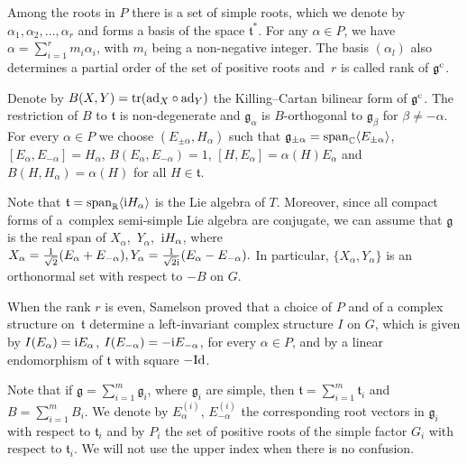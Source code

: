Among the roots in $P$ there is a set of simple roots, which we denote by $\alpha_1, \alpha_2,\dots ,\alpha_r$ and forms a basis of the space $\mathfrak t^*$. For any $\alpha \in P$, we have $\alpha = \sum_{i =1}^r m_i\alpha_i$, with $m_i$ being a non-negative integer. The basis $(\alpha_l)$ also determines a partial order of the set of positive roots and~$r$ is called rank of $\mathfrak g^{\rm c}$.

Denote by $B(X,Y) = {\rm tr} ({\rm ad}_X \circ {\rm ad}_Y)$ the Killing--Cartan bilinear form of $\mathfrak g^{\rm c}$. The restriction of $B$ to $\mathfrak t$ is non-degenerate and $\mathfrak g_{\alpha}$ is $B$-orthogonal to $\mathfrak g_{\beta}$ for $\beta \neq - \alpha$.
 For every $\alpha \in P$ we choose $(E_{\pm \alpha}, H_{\alpha})$ such that $\mathfrak g_{\pm \alpha}= {\rm {span}}_{\mathbb C} \langle E_{\pm\alpha}\rangle$, $[E_{\alpha}, E_{-\alpha}]=H_{\alpha}$, $B(E_{\alpha}, E_{-\alpha}) = 1$, $[H, E_{\alpha}] = \alpha(H)E_{\alpha}$ and $B(H, H_{\alpha}) = \alpha(H)$ for all $H \in \mathfrak t$.

Note that $\mathfrak t = {\rm span}_{\mathbb R} \langle {\rm i} H_{\alpha}\rangle$ is the Lie algebra of $T$. Moreover, since all compact forms of a~complex semi-simple Lie algebra are conjugate, we can assume that $\mathfrak g$ is the real span of $X_{\alpha}$,~$Y_{\alpha}$,~${\rm i}H_{\alpha}$, where $X_{\alpha} = \frac{1}{\sqrt{2}}(E_{\alpha}+E_{-\alpha}), Y_{\alpha} = \frac{1}{\sqrt{2}{\rm i}}(E_{\alpha}-E_{-\alpha}).$
In particular, $\{ X_{\alpha}, Y_{\alpha} \} $ is an orthonormal set with respect to $- B$ on $G$.


When the rank $r$ is even, Samelson proved that a choice of $P$ and of a complex structure on~$\mathfrak t $ determine a left-invariant complex structure $I$ on $G$, which is given by $I(E_{\alpha})= {\rm i}E_{\alpha}$, $I(E_{-\alpha})=-{\rm i}E_{-\alpha}$, for every $\alpha \in P$, and by a linear endomorphism of $\mathfrak{t}$ with square $-{{\rm Id}}$.

Note that if $ \mathfrak g = \sum_{i =1}^m \mathfrak g_i$, where $\mathfrak g_i$ are simple, then $\mathfrak t= \sum_{i=1}^m \mathfrak t_i$ and $B = \sum_{i=1}^m B_i$. We denote by $E_{\alpha}^{(i)}$, $E_{-\alpha}^{(i)}$ the corresponding root vectors in $\mathfrak g_i$ with respect to $\mathfrak t_i$ and by $P_i$ the set of positive roots of the simple factor $G_i$ with respect to $\mathfrak t_i$. We will not use the upper index when there is no confusion.

